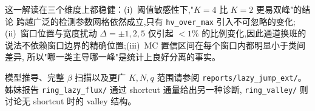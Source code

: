 \documentclass[11pt,fontset=fandol]{ctexart}
\begin{document}
这一解读在三个维度上都稳健：(i)~阈值敏感性下,"$K=4$ 比 $K=2$ 更易双峰"的结论
跨越广泛的检测参数网格依然成立,只有 \texttt{hv\_over\_max} 引入不可忽略的变化;
(ii)~窗口位置与宽度扰动 $\Delta=\pm 1,2,5$ 仅引起 $<1\%$ 的比例变化,因此通道换班的
说法不依赖窗口边界的精确位置;(iii)~MC 置信区间在每个窗口内都明显小于类间差异,
所以"哪一类主导哪一峰"是统计上良好分离的事实。

模型推导、完整 $\beta$ 扫描以及更广 $K,N,q$ 范围请参阅 \texttt{reports/lazy\_jump\_ext/}。
姊妹报告 \texttt{ring\_lazy\_flux/} 通过 shortcut 通量给出另一种诊断,
\texttt{ring\_valley/} 则讨论无 shortcut 时的 valley 结构。
\end{document}
